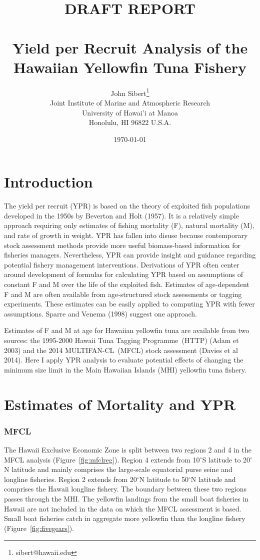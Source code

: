 \documentclass[12pt,letterpaper]{article}
\title{
{\bf\color{red}DRAFT REPORT\normalcolor}\\
~\\
Yield per Recruit Analysis of the Hawaiian
Yellowfin Tuna Fishery}
\author{
John Sibert\thanks{sibert@hawaii.edu}\\
Joint Institute of Marine and Atmospheric Research\\
University of Hawai'i at Manoa\\
Honolulu, HI  96822 U.S.A.\\[0.125in]
\date{\today}
}
\newcommand\doublespacing{\baselineskip=1.6\normalbaselineskip}
\renewcommand\deg[1]{$^\circ$#1}
\newcommand\MFCL{MULTIFAN-CL}
\newcommand\HTTP{Hawaii Tuna Tagging Programme}
\newcommand\help[1]{\color{Magenta}{\it #1 }\normalcolor}
\begin{document}
\maketitle

\doublespacing

\section*{Introduction}
The yield per recruit (YPR) is based on the theory of exploited fish
populations developed in the 1950s
by Beverton and Holt (1957). It is a relatively simple
approach requiring only estimates of fishing mortality (F), natural
mortality (M), and rate of growth in weight. YPR has fallen into
disuse because contemporary stock assessment methods provide more useful
biomass-based
information for fisheries managers. 
Nevertheless, YPR can provide insight and guidance regarding potential
fishery management interventions.
Derivations of
YPR often center around development of formulas for calculating YPR based on
assumptions of constant F and M over the life of the exploited fish.
Estimates of age-dependent F and M are often available from
age-structured stock
assessments or tagging experiments. These estimates can be easily
applied to computing YPR with fewer assumptions. Sparre and Venema
(1998) suggest one approach.

Estimates of F and M at age for Hawaiian yellowfin tuna are available
from two sources: the 1995-2000 \HTTP\ (HTTP) (Adam et 2003) and the
2014 \MFCL\ (MFCL) stock assessment (Davies et al 2014). Here I
apply YPR analysis to evaluate potential effects of changing the
minimum size limit in the Main Hawaiian Islands (MHI) yellowfin tuna
fishery.

\section*{Estimates of Mortality and YPR}
\subsubsection*{MFCL}
The Hawaii Exclusive Economic Zone is split between two regions 2 and 4
in the MFCL analysis (Figure~\ref{fig:mfclreg}). 
Region 4 extends from
10\deg{S} latitude to 20\deg{N} latitude and mainly comprises 
the large-scale equatorial purse seine and longline fisheries.
Region 2 extends from 20\deg{N} latitude to 50\deg{N} latitude
and comprises the Hawaii longline fishery.
The boundary between these two regions passes through the MHI. 
The yellowfin landings from the small boat fisheries in Hawaii are not
included in the data on which the MFCL assessment is based.
Small boat fisheries catch in aggregate more yellowfin than the longline
fishery (Figure~\ref{fig:fivegears})\help{or simple table}.
\end{document}
